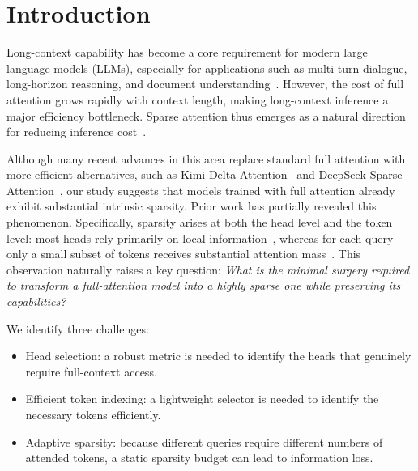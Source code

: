 \section{Introduction}

Long-context capability has become a core requirement for modern large language models (LLMs), especially for applications such as multi-turn dialogue, long-horizon reasoning, and document understanding~\citep{deepseekR1,kimi2,qwen1M,gemini25}. However, the cost of full attention grows rapidly with context length, making long-context inference a major efficiency bottleneck. Sparse attention thus emerges as a natural direction for reducing inference cost~\citep{streamLLM,spargeattn,zucchet2026the}. 


Although many recent advances in this area replace standard full attention with more efficient alternatives, such as Kimi Delta Attention~\citep{kimiteam2025kimilinearexpressiveefficient} and DeepSeek Sparse Attention~\citep{dsa}, our study suggests that models trained with full attention already exhibit substantial intrinsic sparsity. Prior work has partially revealed this phenomenon. Specifically, sparsity arises at both the head level and the token level: most heads rely primarily on local information~\citep{streamingLLM, razorattn,duoattn}, whereas for each query only a small subset of tokens receives substantial attention mass~\citep{fasa,Quest,snapkv}. This observation naturally raises a key question:
\textit{What is the minimal surgery required to transform a full-attention model into a highly sparse one while preserving its capabilities?}

We identify three challenges:
\begin{itemize}[leftmargin=*, itemindent=0pt, itemsep=3pt, topsep=2pt, parsep=0pt, partopsep=0pt]
\item Head selection: a robust metric is needed to identify the heads that genuinely require full-context access.
\item Efficient token indexing: a lightweight selector is needed to identify the necessary tokens efficiently.
\item Adaptive sparsity: because different queries require different numbers of attended tokens, a static sparsity budget can lead to information loss.
\end{itemize}

